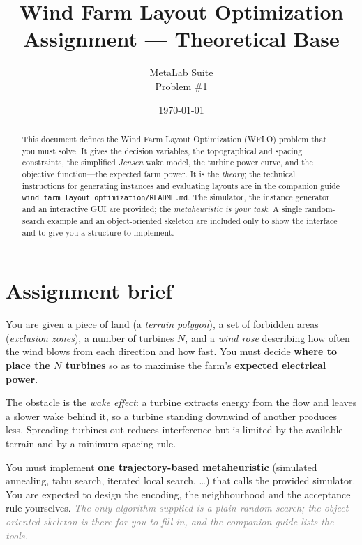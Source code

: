\documentclass[11pt,a4paper]{article}
\title{%
  \textbf{Wind Farm Layout Optimization}\\[2mm]
  \large Assignment --- Theoretical Base}
\author{%
  MetaLab Suite\\[1mm]
  \small Problem \#1}
\date{\today}
\begin{document}
\maketitle

\begin{abstract}
\noindent
This document defines the Wind Farm Layout Optimization (WFLO) problem that you
must solve. It gives the decision variables, the topographical and spacing
constraints, the simplified \emph{Jensen} wake model, the turbine power curve,
and the objective function---the expected farm power. It is the \emph{theory};
the technical instructions for generating instances and evaluating layouts are
in the companion guide \texttt{wind\_farm\_layout\_optimization/README.md}.
The simulator, the instance generator and an interactive GUI are provided; the
\emph{metaheuristic is your task}. A single random-search example and an
object-oriented skeleton are included only to show the interface and to give you
a structure to implement.
\end{abstract}

\tableofcontents

\section{Assignment brief}

You are given a piece of land (a \emph{terrain polygon}), a set of forbidden
areas (\emph{exclusion zones}), a number of turbines $N$, and a \emph{wind
rose} describing how often the wind blows from each direction and how fast. You
must decide \textbf{where to place the $N$ turbines} so as to maximise the
farm's \textbf{expected electrical power}.

The obstacle is the \emph{wake effect}: a turbine extracts energy from the flow
and leaves a slower wake behind it, so a turbine standing downwind of another
produces less. Spreading turbines out reduces interference but is limited by the
available terrain and by a minimum-spacing rule.

You must implement \textbf{one trajectory-based metaheuristic} (simulated
annealing, tabu search, iterated local search, \dots) that calls the provided
simulator. You are expected to design the encoding, the neighbourhood and the
acceptance rule yourselves. \textcolor{gray}{\emph{The only algorithm supplied
is a plain random search; the object-oriented skeleton is there for you to fill
in, and the companion guide lists the tools.}}
\end{document}
